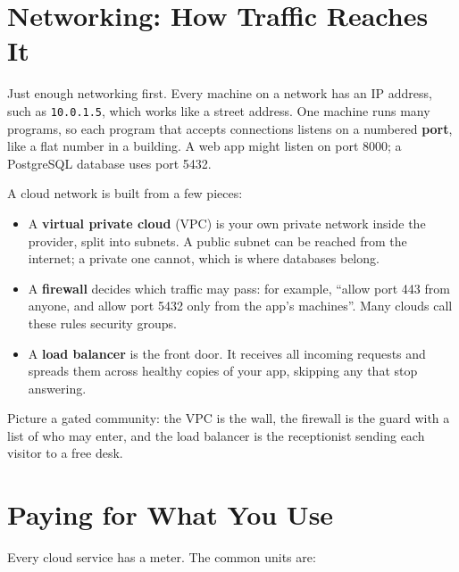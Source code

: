 \section{Networking: How Traffic Reaches It}\label{03-the-cloud-renting-computers-by-the-minute:networking-how-traffic-reaches-it}

Just enough networking first. Every machine on a network has an IP address, such as \texttt{10.0.1.5}, which works like a street address. One machine runs many programs, so each program that accepts connections listens on a numbered \textbf{port}, like a flat number in a building. A web app might listen on port 8000; a PostgreSQL database uses port 5432.

A cloud network is built from a few pieces:

\begin{itemize}
\tightlist
\item
  A \textbf{virtual private cloud} (VPC) is your own private network inside the provider, split into subnets. A public subnet can be reached from the internet; a private one cannot, which is where databases belong.
\item
  A \textbf{firewall} decides which traffic may pass: for example, ``allow port 443 from anyone, and allow port 5432 only from the app's machines''. Many clouds call these rules security groups.
\item
  A \textbf{load balancer} is the front door. It receives all incoming requests and spreads them across healthy copies of your app, skipping any that stop answering.
\end{itemize}

Picture a gated community: the VPC is the wall, the firewall is the guard with a list of who may enter, and the load balancer is the receptionist sending each visitor to a free desk.


\section{Paying for What You Use}\label{03-the-cloud-renting-computers-by-the-minute:paying-for-what-you-use}

Every cloud service has a meter. The common units are:

